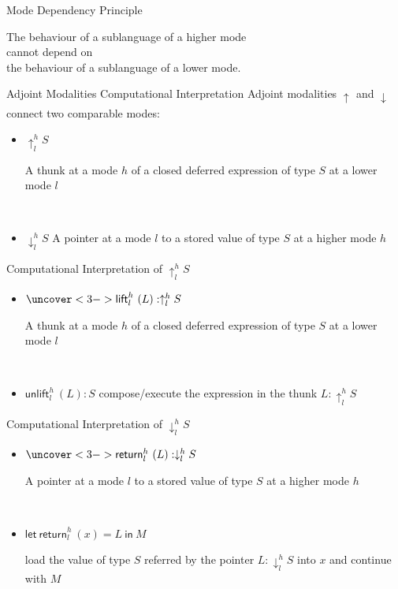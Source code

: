 \documentclass[letterpaper,12pt,aspectratio=169,show notes,dvipsnames]{beamer}
\newcommand{\tyUp}[3]{{\uparrow^{#1}_{#2} #3}}
\newcommand{\tyDown}[3]{{\downarrow^{#1}_{#2} #3}}
\newcommand{\tmLiftName}{{\mathsf{lift}}}
\newcommand{\tmLift}[3]{{\tmLiftName^{#1}_{#2}\ (#3)}}
\newcommand{\tmUnliftName}{{\mathsf{unlift}}}
\newcommand{\tmUnlift}[3]{{\tmUnliftName^{#1}_{#2}\ (#3)}}
\newcommand{\tmReturnName}{{\mathsf{return}}}
\newcommand{\tmReturn}[3]{{\tmReturnName^{#1}_{#2}\ (#3)}}
\newcommand{\tmLetreturnName}{{\mathsf{let}\ \mathsf{return}}}
\newcommand{\tmLetreturn}[5]{{\tmLetreturnName^{#1}_{#2}\ (#3) = #4\ \mathsf{in}\ #5}}
\begin{document}
\begin{frame}{Mode Dependency Principle}
  \color{black}
  \begin{center}
	The behaviour of a sublanguage of {\color{violet}a higher mode}\\cannot depend on\\the behaviour of a sublanguage of {\color{violet}a lower mode}.
  \end{center}
\end{frame}

\begin{frame}{Adjoint Modalities \textemdash Computational Interpretation}
  \color{black}
  Adjoint modalities \(\tyUp{}{}{}\) and \(\tyDown{}{}{}\) connect two comparable modes:
  \pause
  \begin{itemize}[<+->]
  \item \(\tyUp{h}{l}{S}\) \textemdash{} \parbox{25em}{A thunk at a mode \(h\) of a closed deferred expression of type \(S\) at a lower mode \(l\)}\\[1em]
  \item \(\tyDown{h}{l}{S}\) \textemdash{} A pointer at a mode \(l\) to a stored value of type \(S\) at a higher mode \(h\)
  \end{itemize}
\end{frame}

\begin{frame}{Computational Interpretation of \(\tyUp{h}{l}{S}\)}
  \color{black}
  \pause
  \begin{itemize}
  \item<2-> \(\uncover<3->{\tmLift{h}{l}{L} : }\tyUp{h}{l}{S}\) \textemdash{} \parbox{22em}{A thunk at a mode \(h\) of a closed deferred expression  of type \(S\) at a lower mode \(l\)}\\[1em]
  \item<4-> \(\tmUnlift{h}{l}{L} : S\) \textemdash{} compose/execute the expression in the thunk \(L : \tyUp{h}{l}{S}\)
  \end{itemize}
\end{frame}

\begin{frame}{Computational Interpretation of \(\tyDown{h}{l}{S}\)}
  \color{black}
  \pause
  \begin{itemize}
  \item<2-> \(\uncover<3->{\tmReturn{h}{l}{L} : }\tyDown{h}{l}{S}\) \textemdash{} \parbox{18em}{A pointer at a mode \(l\) to a stored value  of type \(S\) at a higher mode \(h\)}\\[1em]
  \item<4-> \(\tmLetreturn{h}{l}{x}{L}{M}\) \textemdash{} \parbox{19em}{load the value of type \(S\) referred by the pointer \(L : \tyDown{h}{l}{S}\) into \(x\) and continue with \(M\)}
  \end{itemize}
\end{frame}
\end{document}
